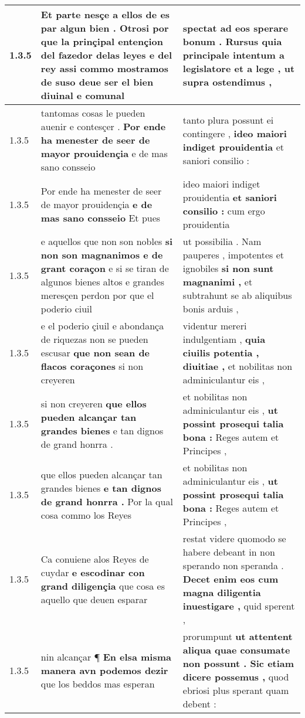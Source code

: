 \begin{tabular}{|p{1cm}|p{6.5cm}|p{6.5cm}|}
1.3.5 & Et parte nesçe a ellos de es par algun bien . \textbf{ Otrosi por que la prinçipal entençion del fazedor delas leyes e del rey } assi commo mostramos de suso deue ser el bien diuinal e comunal & spectat ad eos sperare bonum . \textbf{ Rursus quia principale intentum a legislatore et a lege , } ut supra ostendimus , \\\hline
1.3.5 & tantomas cosas le pueden auenir e contesçer . \textbf{ Por ende ha menester de seer de mayor prouidençia } e de mas sano consseio & tanto plura possunt ei contingere , \textbf{ ideo maiori indiget prouidentia } et saniori consilio : \\\hline
1.3.5 & Por ende ha menester de seer de mayor prouidençia \textbf{ e de mas sano consseio } Et pues & ideo maiori indiget prouidentia \textbf{ et saniori consilio : } cum ergo prouidentia \\\hline
1.3.5 & e aquellos que non son nobles \textbf{ si non son magnanimos e de grant coraçon } e si se tiran de algunos bienes altos e grandes meresçen perdon por que el poderio ciuil & ut possibilia . Nam pauperes , impotentes et ignobiles \textbf{ si non sunt magnanimi , } et subtrahunt se ab aliquibus bonis arduis , \\\hline
1.3.5 & e el poderio çiuil e abondança de riquezas non se pueden escusar \textbf{ que non sean de flacos coraçones } si non creyeren & videntur mereri indulgentiam , \textbf{ quia ciuilis potentia , diuitiae , } et nobilitas non adminiculantur eis , \\\hline
1.3.5 & si non creyeren \textbf{ que ellos pueden alcançar tan grandes bienes } e tan dignos de grand honrra . & et nobilitas non adminiculantur eis , \textbf{ ut possint prosequi talia bona : } Reges autem et Principes , \\\hline
1.3.5 & que ellos pueden alcançar tan grandes bienes \textbf{ e tan dignos de grand honrra . } Por la qual cosa commo los Reyes & et nobilitas non adminiculantur eis , \textbf{ ut possint prosequi talia bona : } Reges autem et Principes , \\\hline
1.3.5 & Ca conuiene alos Reyes de cuydar \textbf{ e escodinar con grand diligençia } que cosa es aquello que deuen esparar & restat videre quomodo se habere debeant in non sperando non speranda . \textbf{ Decet enim eos cum magna diligentia inuestigare , } quid sperent , \\\hline
1.3.5 & nin alcançar ¶ \textbf{ En elsa misma manera avn podemos dezir } que los beddos mas esperan & prorumpunt \textbf{ ut attentent aliqua quae consumate non possunt . Sic etiam dicere possemus , } quod ebriosi plus sperant quam debent : \\\hline

\end{tabular}
